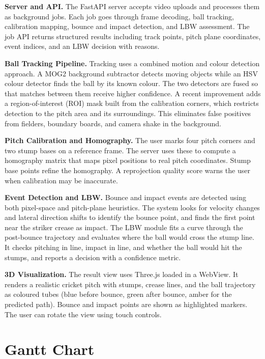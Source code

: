 \documentclass[12pt,a4paper]{article}
\begin{document}
\textbf{Server and API.} The FastAPI server accepts video uploads and processes them as background jobs. Each job goes through frame decoding, ball tracking, calibration mapping, bounce and impact detection, and LBW assessment. The job API returns structured results including track points, pitch plane coordinates, event indices, and an LBW decision with reasons.

\textbf{Ball Tracking Pipeline.} Tracking uses a combined motion and colour detection approach. A MOG2 background subtractor detects moving objects while an HSV colour detector finds the ball by its known colour. The two detectors are fused so that matches between them receive higher confidence. A recent improvement adds a region-of-interest (ROI) mask built from the calibration corners, which restricts detection to the pitch area and its surroundings. This eliminates false positives from fielders, boundary boards, and camera shake in the background.

\textbf{Pitch Calibration and Homography.} The user marks four pitch corners and two stump bases on a reference frame. The server uses these to compute a homography matrix that maps pixel positions to real pitch coordinates. Stump base points refine the homography. A reprojection quality score warns the user when calibration may be inaccurate.

\textbf{Event Detection and LBW.} Bounce and impact events are detected using both pixel-space and pitch-plane heuristics. The system looks for velocity changes and lateral direction shifts to identify the bounce point, and finds the first point near the striker crease as impact. The LBW module fits a curve through the post-bounce trajectory and evaluates where the ball would cross the stump line. It checks pitching in line, impact in line, and whether the ball would hit the stumps, and reports a decision with a confidence metric.

\textbf{3D Visualization.} The result view uses Three.js loaded in a WebView. It renders a realistic cricket pitch with stumps, crease lines, and the ball trajectory as coloured tubes (blue before bounce, green after bounce, amber for the predicted path). Bounce and impact points are shown as highlighted markers. The user can rotate the view using touch controls.

\section{Gantt Chart}
\end{document}
